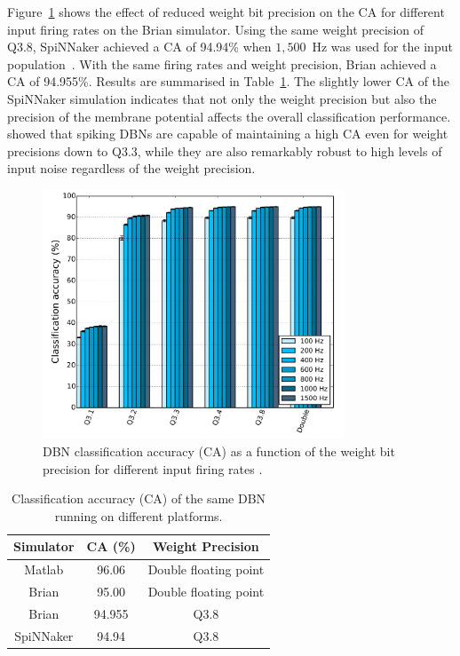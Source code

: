 Figure~\ref{Fig:brianCAfiringrate} shows the effect of reduced weight bit precision on the CA for different input firing rates on the Brian simulator.
Using the same weight precision of Q3.8, SpiNNaker achieved a CA of 94.94\% when $1,500$~Hz was used for the input population~\cite{Stromatias2015scalable}. With the same firing rates and weight precision, Brian achieved a CA of 94.955\%. Results are summarised in Table~\ref{tab:casimulators}.
The slightly lower CA of the SpiNNaker simulation indicates that not only the weight precision but also the precision of the membrane potential affects the overall classification performance.    
\cite{stromatias2015robustness} showed that spiking DBNs are capable of maintaining a high CA even for weight precisions down to Q3.3, while they are also remarkably robust to high levels of input noise regardless of the weight precision. 
\begin{figure}[hbt!]
	\centering
	\includegraphics[width=0.8\textwidth]{pics_bench/fig9}
	\caption{DBN classification accuracy (CA) as a function of the weight bit precision for different input firing rates \cite{stromatias2015robustness}.}
	\label{Fig:brianCAfiringrate}
\end{figure} 


\begin{table}[h]
	\caption{Classification accuracy (CA) of the same DBN running on different platforms.}
	\begin{center}
		\bgroup
		\def\arraystretch{1.4}
		\begin{tabular} {c c c}
			Simulator & CA (\%) & Weight Precision \\
			\hline
			Matlab & 96.06 & Double floating point\\
			Brian & 95.00 & Double floating point\\
			Brian & 94.955 & Q3.8\\
			SpiNNaker & 94.94 & Q3.8\\
		\end{tabular}
		\egroup
		\label{tab:casimulators}
	\end{center}
\end{table}

